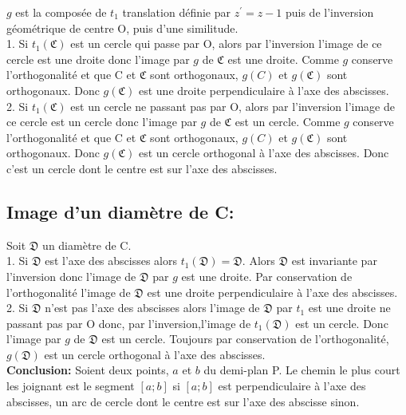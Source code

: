 \documentclass[a4paper, 12pt, twoside]{book}
\begin{document}
$g$ est la composée de $t_{1}$ translation définie par $z^{'}=z-1$ puis de l'inversion géométrique de centre O, puis d'une similitude.\\

1. Si $t_{1}(\mathfrak{C})$ est un cercle qui passe par O, alors par l'inversion l'image de ce cercle est une droite donc l'image par $g$ de $\mathfrak{C}$ est une droite. Comme $g$ conserve l'orthogonalité et que C et $\mathfrak{C}$ sont orthogonaux, $g(C)$ et $g(\mathfrak{C})$ sont orthogonaux. Donc $g(\mathfrak{C})$ est une droite perpendiculaire à l'axe des abscisses.\\

2.  Si $t_{1}(\mathfrak{C})$ est un cercle ne passant pas par O, alors par l'inversion l'image de ce cercle est un cercle donc l'image par $g$ de $\mathfrak{C}$ est un cercle. Comme $g$ conserve l'orthogonalité et que C et $\mathfrak{C}$ sont orthogonaux, $g(C)$ et $g(\mathfrak{C})$ sont orthogonaux. Donc $g(\mathfrak{C})$ est un  cercle orthogonal à l'axe des abscisses. Donc c'est un cercle dont le centre est sur l'axe des abscisses.

\subsection{Image d'un diamètre de C:}


Soit $\mathfrak{D}$ un diamètre de C.\\

1. Si $\mathfrak{D}$ est l'axe des abscisses alors $t_{1}(\mathfrak{D})=\mathfrak{D}$. Alors $\mathfrak{D}$ est invariante par l'inversion donc l'image de $\mathfrak{D}$ par $g$ est une droite. Par conservation de l'orthogonalité l'image de $\mathfrak{D}$ est une droite perpendiculaire à l'axe des abscisses.\\

2. Si $\mathfrak{D}$ n'est pas l'axe des abscisses alors l'image de $\mathfrak{D}$ par $t_{1}$ est une droite ne passant pas par O donc, par l'inversion,l'image de  $t_{1}(\mathfrak{D})$ est un cercle. Donc l'image par $g$ de $\mathfrak{D}$ est un cercle. Toujours par conservation de l'orthogonalité, $g(\mathfrak{D})$ est un cercle orthogonal à l'axe des abscisses.\\

\textbf{Conclusion:} Soient deux points, $a$ et $b$  du demi-plan P. Le chemin le plus court les joignant est le segment $[a; b]$ si $[a; b]$ est perpendiculaire à l'axe des abscisses, un arc de cercle dont le centre est sur l'axe des abscisse sinon.\\
\end{document}
